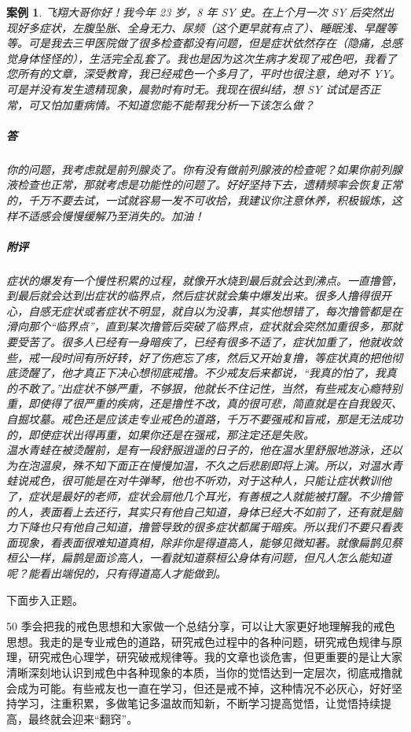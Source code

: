 \documentclass[fontset=founder]{ctexart}
\newtheorem{case}{案例}
\begin{document}
\begin{case}
    飞翔大哥你好！我今年 23 岁，8 年 SY 史。在上个月一次 SY 后突然出现好多症状，左腹坠胀、全身无力、尿频（这个更早就有点了）、睡眠浅、早醒等等。可是我去三甲医院做了很多检查都没有问题，但是症状依然存在（隐痛，总感觉身体怪怪的），生活完全乱套了。我也是因为这次生病才发现了戒色吧，我看了您所有的文章，深受教育，我已经戒色一个多月了，平时也很注意，绝对不 YY。可是并没有发生遗精现象，晨勃时有时无。我现在很纠结，想 SY 试试是否正常，可又怕加重病情。不知道您能不能帮我分析一下该怎么做？
    \subparagraph{答} 你的问题，我考虑就是前列腺炎了。你有没有做前列腺液的检查呢？如果你前列腺液检查也正常，那就考虑是功能性的问题了。好好坚持下去，遗精频率会恢复正常的，千万不要去试，一试就容易一发不可收拾，我建议你注意休养，积极锻炼，这样不适感会慢慢缓解乃至消失的。加油！
    \subparagraph{附评} 症状的爆发有一个慢性积累的过程，就像开水烧到最后就会达到沸点。一直撸管，到最后就会达到出症状的临界点，然后症状就会集中爆发出来。很多人撸得很开心，自感无症状或者症状不明显，就自以为没事，其实他想错了，每次撸管都是在滑向那个“临界点”，直到某次撸管后突破了临界点，症状就会突然加重很多，那就要受苦了。很多人已经有一身暗疾了，已经有很多不适了，症状加重了，他就收敛些，戒一段时间有所好转，好了伤疤忘了疼，然后又开始复撸，等症状真的把他彻底烫醒了，他才真正下决心想彻底戒撸。不少戒友后来都说，“我真的怕了，我真的不敢了。”出症状不够严重，不够狠，他就长不住记性，当然，有些戒友心瘾特别重，即使得了很严重的疾病，还是撸性不改，真的很可悲，简直就是在自我毁灭、自掘坟墓。戒色还是应该走专业戒色的道路，千万不要强戒和盲戒，那是无法成功的，即使症状出得再重，如果你还是在强戒，那注定还是失败。\\ 温水青蛙在被烫醒前，是有一段舒服逍遥的日子的，他在温水里舒服地游泳，还以为在泡温泉，殊不知下面正在慢慢加温，不久之后悲剧即将上演。所以，对温水青蛙说戒色，很可能是在对牛弹琴，他也不听劝，对于这种人，只能让症状教训他了，症状是最好的老师，症状会扇他几个耳光，有善根之人就能被打醒。不少撸管的人，表面看上去还行，其实只有他自己知道，身体已经大不如前了，还有就是脑力下降也只有他自己知道，撸管导致的很多症状都属于暗疾。所以我们不要只看表面现象，看表面很难知道真相，除非你是得道高人，能够见微知著。就像扁鹊见蔡桓公一样，扁鹊是面诊高人，一看就知道蔡桓公身体有问题，但凡人怎么能知道呢？能看出端倪的，只有得道高人才能做到。
\end{case}

下面步入正题。

50 季会把我的戒色思想和大家做一个总结分享，可以让大家更好地理解我的戒色思想。我走的是专业戒色的道路，研究戒色过程中的各种问题，研究戒色规律与原理，研究戒色心理学，研究破戒规律等。我的文章也谈危害，但更重要的是让大家清晰深刻地认识到戒色中各种现象的本质，当你的觉悟达到一定层次，彻底戒撸就会成为可能。有些戒友也一直在学习，但还是戒不掉，这种情况不必灰心，好好坚持学习，注重积累，多做笔记多温故而知新，不断学习提高觉悟，让觉悟持续提高，最终就会迎来“翻窍”。
\end{document}
